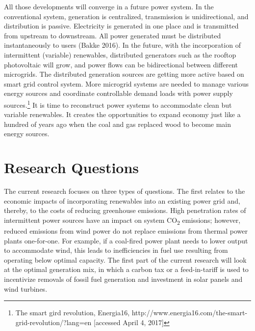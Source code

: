 All those developments will converge in a future power system. In the
conventional system, generation is centralized, transmission is
unidirectional, and distribution is passive. Electricity is generated in
one place and is transmitted from upstream to downstream. All power
generated must be distributed instantaneously to users (Bakke 2016). In
the future, with the incorporation of intermittent (variable)
renewables, distributed generators such as the rooftop photovoltaic will
grow, and power flows can be bidirectional between different microgrids.
The distributed generation sources are getting more active based on
smart grid control system. More microgrid systems are needed to manage
various energy sources and coordinate controllable demand loads with
power supply sources.\footnote{The smart gird revolution, Energia16,
	http://www.energia16.com/the-smart-grid-revolution/?lang=en
	{[}accessed April 4, 2017{]}} It is time to reconstruct power systems
to accommodate clean but variable renewables. It creates the
opportunities to expand economy just like a hundred of years ago when
the coal and gas replaced wood to become main energy sources.

\section{Research Questions}\label{research-questions}

The current research focuses on three types of questions. The first
relates to the economic impacts of incorporating renewables into an
existing power grid and, thereby, to the costs of reducing greenhouse
emissions. High penetration rates of intermittent power sources have an
impact on system CO\textsubscript{2} emissions; however, reduced
emissions from wind power do not replace emissions from thermal power
plants one-for-one. For example, if a coal-fired power plant needs to
lower output to accommodate wind, this leads to inefficiencies in fuel
use resulting from operating below optimal capacity. The first part of
the current research will look at the optimal generation mix, in which a
carbon tax or a feed-in-tariff is used to incentivize removals of fossil
fuel generation and investment in solar panels and wind turbines.

